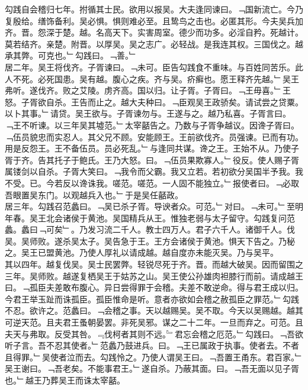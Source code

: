\documentclass{zhvt-classic}
\begin{document}
\hspace*{2em}勾践自会稽归七年。拊循其士民。欲用以报吴。大夫逢同谏曰。﹁国新流亡。今乃复殷给。缮饰备利。吴必惧。惧则难必至。且鸷鸟之击也。必匿其形。今夫吴兵加齐。晋。怨深于楚。越。名高天下。实害周室。德少而功多。必淫自矜。死越计。莫若结齐。亲楚。附晋。以厚吴。吴之志广。必轻战。是我连其权。三国伐之。越承其弊。可克也。﹂勾践曰。﹁善。﹂\\
\hspace*{2em}居二年。吴王将伐齐。子胥谏曰。﹁未可。臣告勾践食不重味。与百姓同苦乐。此人不死。必死国患。吴有越。腹心之疾。齐与吴。疥癣也。愿王释齐先越。﹂吴王弗听。遂伐齐。败之艾陵。虏齐高。国以归。让子胥。子胥曰。﹁王毋喜。﹂王怒。子胥欲自杀。王告而止之。越大夫种曰。﹁臣观吴王政骄矣。请试尝之贷粟。以卜其事。﹂请贷。吴王欲与。子胥谏勿与。王遂与之。越乃私喜。子胥言曰。﹁王不听谏。以三年吴其墟范。﹂太宰嚭告之。乃数与子胥争越议。因谗子胥曰。﹁伍员貌忠而实忍人。其父兄不顾。安能顾王。王前欲伐齐。员强谏。已而有功。用是反怨王。王不备伍员。员必死乱。﹂与逢同共谋。谗之王。王始不从。乃使子胥于齐。告其托子于鲍氏。王乃大怒。曰。﹁伍员果欺寡人。﹂役反。使人赐子胥属镂剑以自杀。子胥大笑曰。﹁我令而父霸。我又立若。若初欲分吴国半予我。我不受。已。今若反以谗诛我。嗟范。嗟范。一人固不能独立。﹂报使者曰。﹁必取吾眼置吴东门。以观越兵入也。﹂于是吴任嚭政。\\
\hspace*{2em}居三年。勾践召范蠡曰。﹁吴已杀子胥。导谀者众。可范。﹂对曰。﹁未可。﹂至明年春。吴王北会诸侯于黄池。吴国精兵从王。惟独老弱与太子留守。勾践复问范蠡。蠡曰﹁可矣﹂。乃发习流二千人。教士四万人。君子六千人。诸御千人。伐吴。吴师败。遂杀吴太子。吴告急于王。王方会诸侯于黄池。惧天下告之。乃秘之。吴王已盟黄池。乃使人厚礼以请成越。越自度亦未能灭吴。乃与吴平。\\
\hspace*{2em}其以四年。越复伐吴。吴士民罢弊。轻锐尽死于齐。晋。而越大破吴。因而留围之三年。吴师败。越遂复栖吴王于姑苏之山。吴王使公孙雄肉袒膝行而前。请成越王曰。﹁孤臣夫差敢布腹心。异日尝得罪于会稽。夫差不敢逆命。得与君王成以归。今君王举玉趾而诛孤臣。孤臣惟命是听。意者亦欲如会稽之赦孤臣之罪范。﹂勾践不忍。欲许之。范蠡曰。﹁会稽之事。天以越赐吴。吴不取。今天以吴赐越。越其可逆天范。且夫君王蚤朝晏罢。非死吴邪。谋之二十二年。一旦而弃之。可范。且夫天与弗取。反受其咎。﹃伐柯者其则不远。﹄君忘会稽之厄范。﹂勾践曰。﹁吾欲听子言。吾不忍其使者。﹂范蠡乃鼓进兵。曰。﹁王已属政于执事。使者去。不者且得罪。﹂吴使者泣而去。勾践怜之。乃使人谓吴王曰。﹁吾置王甬东。君百家。﹂吴王谢曰。﹁吾老矣。不能事君王。﹂遂自杀。乃蔽其面。曰。﹁吾无面以见子胥也。﹂越王乃葬吴王而诛太宰嚭。\\
\end{document}
